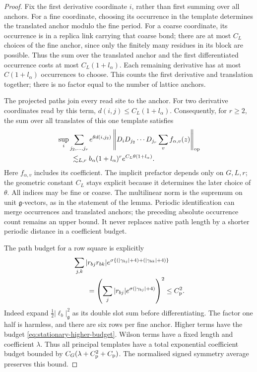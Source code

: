 \documentclass[11pt,reqno]{amsart}
\numberwithin{equation}{section}
\theoremstyle{definition}
\theoremstyle{remark}
\newcommand{\g}{\mathfrak g}
\begin{document}
\begin{proof}
Fix the first derivative coordinate \(i\), rather than
first summing over all anchors. For a fine coordinate,
choosing its occurrence in the template determines the
translated anchor modulo the fine period. For a coarse
coordinate, its occurrence is in a replica link carrying
that coarse bond; there are at most \(C_L\) choices of the
fine anchor, since only the finitely many residues in its
block are possible. Thus the sum over the translated
anchor and the first differentiated occurrence costs at
most \(C_L(1+l_\alpha)\). Each remaining derivative has
at most \(C(1+l_\alpha)\) occurrences to choose. This
counts the first derivative and translation together;
there is no factor equal to the number of lattice anchors.

The projected paths join every read site to the anchor.
For two derivative coordinates read by this term,
\(d(i,j)\le C_L(1+l_\alpha)\). Consequently, for \(r\ge2\),
the sum over all translates of this one template satisfies
\begin{equation}
 \begin{split}
 &\sup_i\sum_{j_2,\ldots,j_r}e^{\theta d(i,j_2)}
   \left\|D_iD_{j_2}\cdots D_{j_r}
                   \sum_v f_{\alpha,v}(z)\right\|_{\rm op}\\
 &\qquad\lesssim_{L,r}b_\alpha(1+l_\alpha)^r
                                      e^{C_L\theta(1+l_\alpha)}.
 \end{split}
 \label{eq:action-rooted-template-price}
\end{equation}
Here \(f_{\alpha,v}\) includes its coefficient.
The implicit prefactor depends only on \(G,L,r\);
the geometric constant \(C_L\) stays explicit because it
determines the later choice of \(\theta\).
All indices may be fine or coarse. The multilinear norm is the supremum
on unit \(\g\)-vectors, as in the statement of the lemma.
Periodic identification can merge occurrences and translated
anchors; the preceding absolute occurrence count remains
an upper bound. It never replaces native path length by
a shorter periodic distance in a coefficient budget.

The path budget for a row square is explicitly
\begin{align}
 &\sum_{j,k}|r_{bj}r_{bk}|
       e^{\sigma\{(|\gamma_{bj}|+4)+(|\gamma_{bk}|+4)\}}
                                                        \notag\\
 &\qquad=
 \left(\sum_j|r_{bj}|e^{\sigma(|\gamma_{bj}|+4)}\right)^2
                                                \le C_{\rm p}^2.
 \label{eq:action-double-row-budget}
\end{align}
Indeed expand \(\frac12|\ell_b|_{\g}^2\) as its double
slot sum before differentiating. The factor one half is
harmless, and there are six rows per fine anchor. Higher
terms have the budget \eqref{eq:stationary-higher-budget}.
Wilson terms have a fixed length and coefficient \(\lambda\).
Thus all principal templates have a total exponential
coefficient budget bounded by
\(C_G(\lambda+C_{\rm p}^2+C_{\rm p})\). The normalised
signed symmetry average preserves this bound.


\end{proof}
\end{document}
